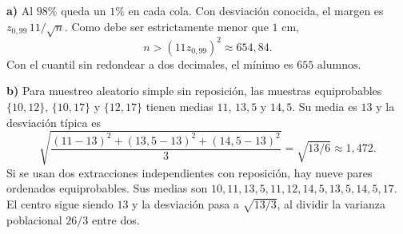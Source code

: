 \textbf{a)} Al $98\%$ queda un $1\%$ en cada cola. Con desviación conocida, el margen es $z_{0{,}99}\,11/\sqrt n$. Como debe ser estrictamente menor que $1$ cm,
\[
n>(11z_{0{,}99})^2\approx654{,}84.
\]
Con el cuantil sin redondear a dos decimales, el mínimo es $\boxed{655\text{ alumnos}}$.

\textbf{b)} Para muestreo aleatorio simple sin reposición, las muestras equiprobables $\{10,12\}$, $\{10,17\}$ y $\{12,17\}$ tienen medias $11$, $13{,}5$ y $14{,}5$. Su media es $\boxed{13}$ y la desviación típica es
\[
\sqrt{\frac{(11-13)^2+(13{,}5-13)^2+(14{,}5-13)^2}{3}}
=\boxed{\sqrt{13/6}}\approx1{,}472.
\]
Si se usan dos extracciones independientes con reposición, hay nueve pares ordenados equiprobables. Sus medias son $10,11,13{,}5,11,12,14{,}5,13{,}5,14{,}5,17$. El centro sigue siendo $13$ y la desviación pasa a $\sqrt{13/3}$, al dividir la varianza poblacional $26/3$ entre dos.
